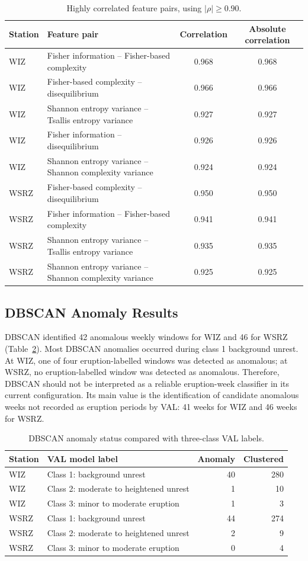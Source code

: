 \documentclass[journal]{IEEEtran}
\begin{document}
\begin{table}[!t]
\centering
\caption{Highly correlated feature pairs, using $|\rho| \geq 0.90$.}
\label{tab:feature_corr}
\begin{tabular}{llcc}
\toprule
Station & Feature pair & Correlation & Absolute correlation \\
\midrule
WIZ  & Fisher information -- Fisher-based complexity & 0.968 & 0.968 \\
WIZ  & Fisher-based complexity -- disequilibrium & 0.966 & 0.966 \\
WIZ  & Shannon entropy variance -- Tsallis entropy variance & 0.927 & 0.927 \\
WIZ  & Fisher information -- disequilibrium & 0.926 & 0.926 \\
WIZ  & Shannon entropy variance -- Shannon complexity variance & 0.924 & 0.924 \\
WSRZ & Fisher-based complexity -- disequilibrium & 0.950 & 0.950 \\
WSRZ & Fisher information -- Fisher-based complexity & 0.941 & 0.941 \\
WSRZ & Shannon entropy variance -- Tsallis entropy variance & 0.935 & 0.935 \\
WSRZ & Shannon entropy variance -- Shannon complexity variance & 0.925 & 0.925 \\
\bottomrule
\end{tabular}
\end{table}

\subsection{DBSCAN Anomaly Results}
DBSCAN identified 42 anomalous weekly windows for WIZ and 46 for WSRZ (Table~\ref{tab:dbscan}). Most DBSCAN anomalies occurred during class 1 background unrest. At WIZ, one of four eruption-labelled windows was detected as anomalous; at WSRZ, no eruption-labelled window was detected as anomalous. Therefore, DBSCAN should not be interpreted as a reliable eruption-week classifier in its current configuration. Its main value is the identification of candidate anomalous weeks not recorded as eruption periods by VAL: 41 weeks for WIZ and 46 weeks for WSRZ.

\begin{table}[!t]
\centering
\caption{DBSCAN anomaly status compared with three-class VAL labels.}
\label{tab:dbscan}
\begin{tabular}{llrr}
\toprule
Station & VAL model label & Anomaly & Clustered \\
\midrule
WIZ  & Class 1: background unrest & 40 & 280 \\
WIZ  & Class 2: moderate to heightened unrest & 1 & 10 \\
WIZ  & Class 3: minor to moderate eruption & 1 & 3 \\
WSRZ & Class 1: background unrest & 44 & 274 \\
WSRZ & Class 2: moderate to heightened unrest & 2 & 9 \\
WSRZ & Class 3: minor to moderate eruption & 0 & 4 \\
\bottomrule
\end{tabular}
\end{table}
\end{document}
